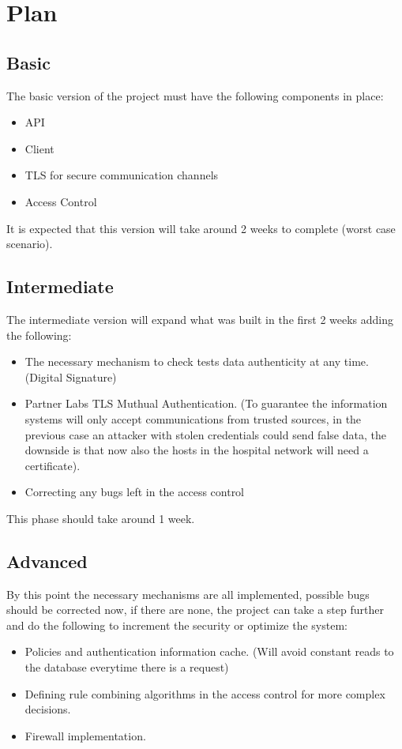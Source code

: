 \section{Plan}

\subsection{Basic}
The basic version of the project must have the following components in place:
\begin{itemize}
	\item API
	\item Client
	\item TLS for secure communication channels
	\item Access Control
\end{itemize}

It is expected that this version will take around 2 weeks to complete (worst case scenario). 


\subsection{Intermediate}
The intermediate version will expand what was built in the first 2 weeks adding the following:
\begin{itemize}
	\item The necessary mechanism to check tests data authenticity at any time. (Digital Signature)
	\item Partner Labs TLS Muthual Authentication. (To guarantee the information systems will only accept communications from trusted sources, in the previous case an attacker with stolen credentials could send false data, the downside is that now also the hosts in the hospital network will need a certificate). 
	\item Correcting any bugs left in the access control
\end{itemize}

This phase should take around 1 week.


\subsection{Advanced}

By this point the necessary mechanisms are all implemented, possible bugs should be corrected now, if there are none, the project can take a step further and do the following to increment the security or optimize the system:

\begin{itemize}
	\item Policies and authentication information cache. (Will avoid constant reads to the database everytime there is a request)
	\item Defining rule combining algorithms in the access control for  more complex decisions.
	\item Firewall implementation.
\end{itemize}


